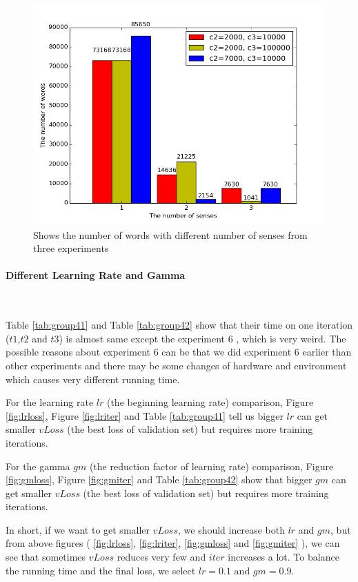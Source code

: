 \begin{figure}[tb]
  \centering
	\includegraphics[width=1.0\textwidth]{sensecount} 
	\caption{Shows the number of words with different number of senses from three experiments}
	\label{fig:sensecount}
\end{figure}


\paragraph{Different Learning Rate and Gamma} \ 

Table \ref{tab:group41} and Table \ref{tab:group42} show that their time on one iteration ($t1$,$t2$ and $t3$) is almost same except the experiment 6 , which is very weird. The possible reasons about experiment 6 can be that we did experiment 6 earlier than other experiments and there may be some changes of hardware and environment which causes very different running time. 

For the learning rate $lr$ (the beginning learning rate) comparison, Figure \ref{fig:lrloss}, Figure \ref{fig:lriter} and Table \ref{tab:group41} tell us bigger $lr$ can get smaller $vLoss$ (the best loss of validation set) but requires more training iterations.

For the gamma $gm$ (the reduction factor of learning rate) comparison, Figure \ref{fig:gmloss}, Figure \ref{fig:gmiter} and Table \ref{tab:group42} show that bigger $gm$ can get smaller $vLoss$ (the best loss of validation set) but requires more training iterations.

In short, if we want to get smaller $vLoss$, we should increase both $lr$ and $gm$, but from above figures ( \ref{fig:lrloss}, \ref{fig:lriter}, \ref{fig:gmloss} and \ref{fig:gmiter} ), we can see that sometimes $vLoss$ reduces very few and $iter$ increases a lot. To balance the running time and the final loss, we select $lr=0.1$ and $gm=0.9$. 

